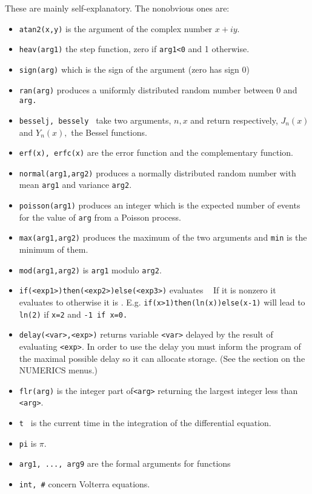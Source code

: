 \documentclass{article}
\begin{document}
These are mainly self-explanatory. The nonobvious ones are:
\begin{itemize}
\item {\tt atan2(x,y)} is the argument of the complex number $x+iy.$
\item {\tt heav(arg1)} the step function, zero if {\tt arg1<0} and 1 otherwise.
\item {\tt sign(arg)} which is the sign of the argument (zero has sign 0)
\item {\tt ran(arg)} produces a uniformly distributed random number
between 0 and {\tt arg.}
\item {\tt besselj, bessely } take two arguments, $n,x$ and return
respectively, $J_n(x)$ and $Y_n(x),$ the Bessel functions.
\item { \tt erf(x), erfc(x)} are the error function and the
complementary function.
\item {\tt normal(arg1,arg2)} produces a normally distributed random number
with mean {\tt arg1}  and variance {\tt arg2}.
\item {\tt poisson(arg1)} produces an integer which is the expected number
of events for the value of {\tt arg} from a Poisson process.
\item {\tt max(arg1,arg2)} produces the maximum of the two arguments
and {\tt min}  is
the minimum of them.
\item {\tt mod(arg1,arg2)} is  {\tt arg1} modulo {\tt arg2}.
\item {\tt if(<exp1>)then(<exp2>)else(<exp3>)} evaluates {\tt <exp1> }
If it is nonzero
it evaluates to {\tt <exp2>} otherwise it is { \tt <exp3>}.  E.g. {\tt if(x>1)then(ln(x))else(x-1)}
will lead to {\tt ln(2)}  if {\tt x=2}  and { \tt -1 if x=0.}
\item {\tt delay(<var>,<exp>)} returns variable {\tt <var>} delayed by the result of
 evaluating {\tt <exp>}.  In order to use the delay you must inform
the program of the maximal possible delay so it can allocate storage.
(See the section on the NUMERICS menus.)
\item {\tt  flr(arg)}  is the integer part of{\tt  <arg>} returning the largest integer less than {\tt <arg>}.
\item  {\tt t } is the current time in the integration of the differential equation.
\item {\tt  pi}  is $\pi.$
\item {\tt arg1, ..., arg9} are the formal arguments for functions
\item {\tt int, \#} concern Volterra equations.

\end{itemize}
\end{document}
